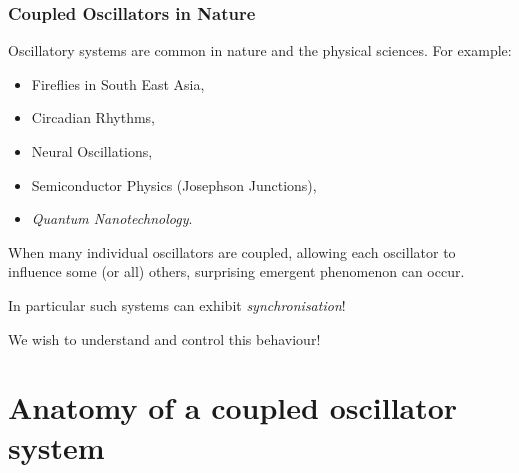 \documentclass[10pt,reqno]{beamer}
\begin{document}
\begin{frame}
\frametitle{Coupled Oscillators in Nature}
Oscillatory systems are common in nature and the physical sciences. For example:
\begin{itemize}
	\item Fireflies in South East Asia,
	\item Circadian Rhythms,
	\item Neural Oscillations,
	\item Semiconductor Physics (Josephson Junctions), 
	\item {\em Quantum Nanotechnology}.
\end{itemize}
When many individual oscillators are coupled, allowing each oscillator to influence some (or all) others, surprising emergent phenomenon can occur.

In particular such systems can exhibit {\em synchronisation}!

We wish to understand and control this behaviour!
\end{frame}

\section{Anatomy of a coupled oscillator system}
\end{document}
